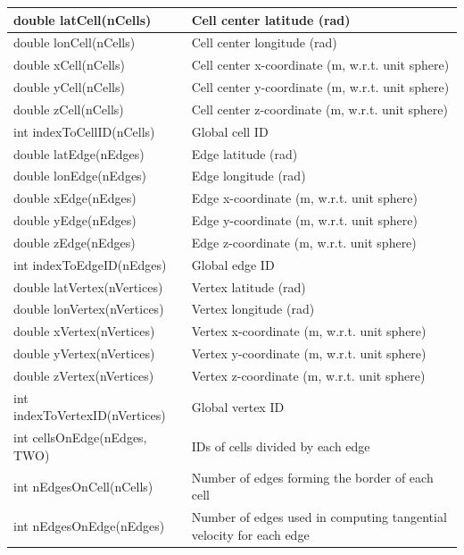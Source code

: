 {\small
\begin{longtable}{|p{2.75in} |p{3.5in}|}
 \hline
        double latCell(nCells)       & Cell center latitude (rad) \\ \hline
        double lonCell(nCells)       & Cell center longitude (rad) \\ \hline
        double xCell(nCells)         & Cell center x-coordinate (m, w.r.t. unit sphere) \\ \hline
        double yCell(nCells)         & Cell center y-coordinate (m, w.r.t. unit sphere) \\ \hline
        double zCell(nCells)         & Cell center z-coordinate (m, w.r.t. unit sphere) \\ \hline
        int indexToCellID(nCells)    & Global cell ID \\ \hline
        double latEdge(nEdges)       & Edge latitude (rad) \\ \hline
        double lonEdge(nEdges)       & Edge longitude (rad) \\ \hline
        double xEdge(nEdges)         & Edge x-coordinate (m, w.r.t. unit sphere) \\ \hline
        double yEdge(nEdges)         & Edge y-coordinate (m, w.r.t. unit sphere) \\ \hline
        double zEdge(nEdges)         & Edge z-coordinate (m, w.r.t. unit sphere) \\ \hline
        int indexToEdgeID(nEdges)    & Global edge ID \\ \hline
        double latVertex(nVertices)      & Vertex latitude (rad) \\ \hline
        double lonVertex(nVertices)      & Vertex longitude (rad) \\ \hline
        double xVertex(nVertices)        & Vertex x-coordinate (m, w.r.t. unit sphere) \\ \hline
        double yVertex(nVertices)        & Vertex y-coordinate (m, w.r.t. unit sphere) \\ \hline
        double zVertex(nVertices)        & Vertex z-coordinate (m, w.r.t. unit sphere) \\ \hline
        int indexToVertexID(nVertices)   & Global vertex ID \\ \hline
        int cellsOnEdge(nEdges, TWO)     & IDs of cells divided by each edge \\ \hline
        int nEdgesOnCell(nCells)         & Number of edges forming the border of each cell \\ \hline
        int nEdgesOnEdge(nEdges)         & Number of edges used in computing tangential velocity for each edge \\ \hline

\end{longtable}}
